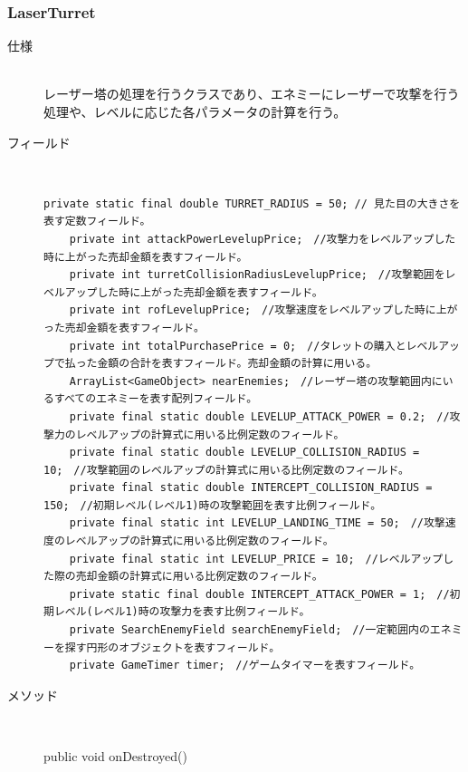 \documentclass[11pt,a4j]{jarticle}
\begin{document}
\subsubsection{LaserTurret}
\begin{description}
    \item[仕様]\mbox{}\\
          レーザー塔の処理を行うクラスであり、エネミーにレーザーで攻撃を行う処理や、レベルに応じた各パラメータの計算を行う。
    \item[フィールド]\mbox{}\\
          \begin{lstlisting}[numbers=none]
    private static final double TURRET_RADIUS = 50; // 見た目の大きさを表す定数フィールド。
    private int attackPowerLevelupPrice;　//攻撃力をレベルアップした時に上がった売却金額を表すフィールド。
    private int turretCollisionRadiusLevelupPrice;　//攻撃範囲をレベルアップした時に上がった売却金額を表すフィールド。
    private int rofLevelupPrice;　//攻撃速度をレベルアップした時に上がった売却金額を表すフィールド。
    private int totalPurchasePrice = 0;　//タレットの購入とレベルアップで払った金額の合計を表すフィールド。売却金額の計算に用いる。
    ArrayList<GameObject> nearEnemies;　//レーザー塔の攻撃範囲内にいるすべてのエネミーを表す配列フィールド。
    private final static double LEVELUP_ATTACK_POWER = 0.2;　//攻撃力のレベルアップの計算式に用いる比例定数のフィールド。
    private final static double LEVELUP_COLLISION_RADIUS = 10;　//攻撃範囲のレベルアップの計算式に用いる比例定数のフィールド。
    private final static double INTERCEPT_COLLISION_RADIUS = 150;　//初期レベル(レベル1)時の攻撃範囲を表す比例フィールド。
    private final static int LEVELUP_LANDING_TIME = 50;　//攻撃速度のレベルアップの計算式に用いる比例定数のフィールド。
    private final static int LEVELUP_PRICE = 10;　//レベルアップした際の売却金額の計算式に用いる比例定数のフィールド。
    private static final double INTERCEPT_ATTACK_POWER = 1;　//初期レベル(レベル1)時の攻撃力を表す比例フィールド。
    private SearchEnemyField searchEnemyField;　//一定範囲内のエネミーを探す円形のオブジェクトを表すフィールド。
    private GameTimer timer;　//ゲームタイマーを表すフィールド。
                \end{lstlisting}
    \item[メソッド]\mbox{}\\
          \begin{description}
              \item[public void onDestroyed()]\mbox{}\\

\end{description}
\end{description}
\end{document}
